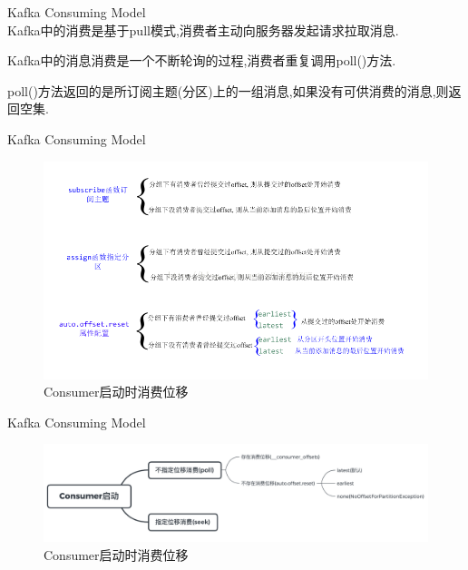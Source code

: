 \begin{frame}[plain,t]{Kafka Consuming Model} %
	 \\  \vspace{2ex}
	Kafka中的消费是基于pull模式,消费者主动向服务器发起请求拉取消息.
	
	\vspace{2ex}
	Kafka中的消息消费是一个不断轮询的过程,消费者重复调用poll()方法.
	
		\vspace{2ex}
		poll()方法返回的是所订阅主题(分区)上的一组消息,如果没有可供消费的消息,则返回空集.
	
\end{frame}
\begin{frame}[plain,t]{Kafka Consuming Model} %
	 \\  \vspace{2ex}
	
	\begin{figure}
		\centering
		\includegraphics[width=0.9\linewidth]{image/0312}
		\caption{Consumer启动时消费位移}
		\label{fig:0312}
	\end{figure}
	
\end{frame}
\begin{frame}[plain,t]{Kafka Consuming Model} %
	 \\  \vspace{2ex}
	\begin{figure}
		\centering
		\includegraphics[width=1\linewidth]{image/0313}
		\caption{Consumer启动时消费位移}
		\label{fig:0313}
	\end{figure}
	
\end{frame}
